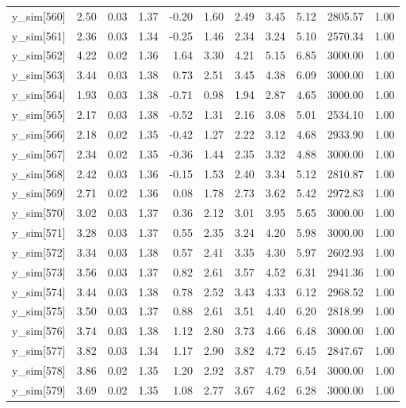 \begin{table}[ht]
\begin{tabular}{rrrrrrrrrrr}
  y\_sim[560] & 2.50 & 0.03 & 1.37 & -0.20 & 1.60 & 2.49 & 3.45 & 5.12 & 2805.57 & 1.00 \\ 
  y\_sim[561] & 2.36 & 0.03 & 1.34 & -0.25 & 1.46 & 2.34 & 3.24 & 5.10 & 2570.34 & 1.00 \\ 
  y\_sim[562] & 4.22 & 0.02 & 1.36 & 1.64 & 3.30 & 4.21 & 5.15 & 6.85 & 3000.00 & 1.00 \\ 
  y\_sim[563] & 3.44 & 0.03 & 1.38 & 0.73 & 2.51 & 3.45 & 4.38 & 6.09 & 3000.00 & 1.00 \\ 
  y\_sim[564] & 1.93 & 0.03 & 1.38 & -0.71 & 0.98 & 1.94 & 2.87 & 4.65 & 3000.00 & 1.00 \\ 
  y\_sim[565] & 2.17 & 0.03 & 1.38 & -0.52 & 1.31 & 2.16 & 3.08 & 5.01 & 2534.10 & 1.00 \\ 
  y\_sim[566] & 2.18 & 0.02 & 1.35 & -0.42 & 1.27 & 2.22 & 3.12 & 4.68 & 2933.90 & 1.00 \\ 
  y\_sim[567] & 2.34 & 0.02 & 1.35 & -0.36 & 1.44 & 2.35 & 3.32 & 4.88 & 3000.00 & 1.00 \\ 
  y\_sim[568] & 2.42 & 0.03 & 1.36 & -0.15 & 1.53 & 2.40 & 3.34 & 5.12 & 2810.87 & 1.00 \\ 
  y\_sim[569] & 2.71 & 0.02 & 1.36 & 0.08 & 1.78 & 2.73 & 3.62 & 5.42 & 2972.83 & 1.00 \\ 
  y\_sim[570] & 3.02 & 0.03 & 1.37 & 0.36 & 2.12 & 3.01 & 3.95 & 5.65 & 3000.00 & 1.00 \\ 
  y\_sim[571] & 3.28 & 0.03 & 1.37 & 0.55 & 2.35 & 3.24 & 4.20 & 5.98 & 3000.00 & 1.00 \\ 
  y\_sim[572] & 3.34 & 0.03 & 1.38 & 0.57 & 2.41 & 3.35 & 4.30 & 5.97 & 2602.93 & 1.00 \\ 
  y\_sim[573] & 3.56 & 0.03 & 1.37 & 0.82 & 2.61 & 3.57 & 4.52 & 6.31 & 2941.36 & 1.00 \\ 
  y\_sim[574] & 3.44 & 0.03 & 1.38 & 0.78 & 2.52 & 3.43 & 4.33 & 6.12 & 2968.52 & 1.00 \\ 
  y\_sim[575] & 3.50 & 0.03 & 1.37 & 0.88 & 2.61 & 3.51 & 4.40 & 6.20 & 2818.99 & 1.00 \\ 
  y\_sim[576] & 3.74 & 0.03 & 1.38 & 1.12 & 2.80 & 3.73 & 4.66 & 6.48 & 3000.00 & 1.00 \\ 
  y\_sim[577] & 3.82 & 0.03 & 1.34 & 1.17 & 2.90 & 3.82 & 4.72 & 6.45 & 2847.67 & 1.00 \\ 
  y\_sim[578] & 3.86 & 0.02 & 1.35 & 1.20 & 2.92 & 3.87 & 4.79 & 6.54 & 3000.00 & 1.00 \\ 
  y\_sim[579] & 3.69 & 0.02 & 1.35 & 1.08 & 2.77 & 3.67 & 4.62 & 6.28 & 3000.00 & 1.00 \\ 

\end{tabular}
\end{table}
